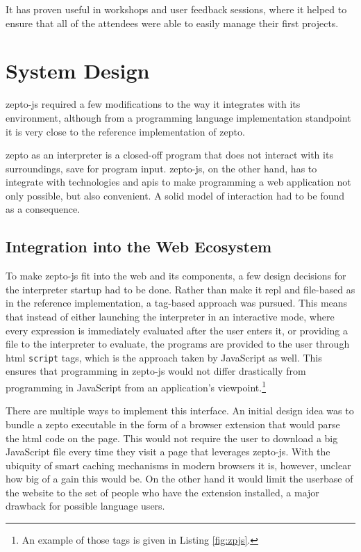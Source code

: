 \documentclass[oneside,11pt,xetex]{scrbook}
\begin{document}
It has proven useful in workshops and user feedback sessions, where it helped
to ensure that all of the attendees were able to easily manage their first
projects.

\chapter{System Design}
\label{chap:SystemDesign}

zepto-js required a few modifications to the way it integrates with its
environment, although from a programming language implementation standpoint
it is very close to the reference implementation of zepto.

zepto as an interpreter is a closed-off program that does not interact
with its surroundings, save for program input. zepto-js, on the other hand,
has to integrate with technologies and \glspl{api} to make programming
a web application not only possible, but also convenient. A solid model of
interaction had to be found as a consequence.

\section{Integration into the Web Ecosystem}

To make zepto-js fit into the web and its components, a few design decisions
for the interpreter startup had to be done. Rather than make it \gls{repl} and
file-based as in the reference implementation, a tag-based approach was pursued.
This means that instead of either launching the interpreter in an interactive
mode, where every expression is immediately evaluated after the user enters it,
or providing a file to the interpreter to evaluate, the programs are provided
to the user through \gls{html} \texttt{script} tags, which is the approach
taken by JavaScript as well. This ensures that programming in zepto-js would
not differ drastically from programming in JavaScript from an application's
viewpoint.\footnote{An example of those tags is given in Listing \ref{fig:zpjs}.}

There are multiple ways to implement this interface. An initial design idea was to
bundle a zepto executable in the form of a browser extension that would parse the
\gls{html} code on the page. This would not require the user to download a big JavaScript
file every time they visit a page that leverages zepto-js. With the ubiquity of
smart caching mechanisms in modern browsers it is, however, unclear how big of
a gain this would be. On the other hand it would limit the userbase of the website
to the set of people who have the extension installed, a major drawback for possible
language users.
\end{document}
